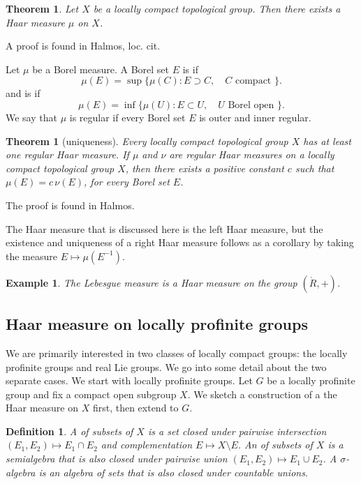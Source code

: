 \documentclass{amsart}
\newtheorem{definition}[equation]{Definition}
\newtheorem{theorem}[equation]{Theorem}
\newtheorem{example}[exercise]{Example}
\begin{document}
\begin{theorem} Let $X$ be a locally compact topological group.
Then there exists a Haar measure $\mu$ on $X$.
\end{theorem}

A proof is found in Halmos, loc. cit.

Let $\mu$ be a Borel measure.
A Borel set $E$ is 
 if
\[
\mu(E) = \sup \{\mu(C) : E\supset C,\quad C \text{ compact } \}.
\]
and is 
 if 
\[
\mu(E) = \inf \{\mu(U) : E\subset U,\quad U \text{ Borel open } \}.
\]
We say that $\mu$ is regular if every Borel set $E$ is outer and inner regular.

\begin{theorem}[uniqueness]  Every locally compact topological group $X$ has
 at least one regular Haar measure.  If $\mu$ and $\nu$ are regular
Haar measures on a locally compact topological group $X$, then there exists
a positive constant $c$ such that $\mu(E)=c\,\nu(E)$, for every Borel set $E$.
\end{theorem}

The proof is found in Halmos.

The Haar measure that is discussed here is the left Haar measure, but
the existence and uniqueness of a right Haar measure follows as a
corollary by taking the measure $E\mapsto \mu(E^{-1})$.

\begin{example} The Lebesgue measure is a Haar measure on the group
  $(\ring{R},+)$.
\end{example}

\newpage

\subsection{Haar measure on locally profinite groups}

We are primarily interested in two classes of locally compact groups:
the locally profinite groups and real Lie groups.  We go into some
detail about the two separate cases.  We start with locally profinite
groups.  Let $G$ be a locally profinite group and fix a compact open
subgroup $X$.  We sketch a construction of a 
the Haar measure on $X$ first, then extend
to $G$.

\begin{definition}
  A  of subsets of $X$ is a set closed under
  pairwise intersection $(E_1,E_2)\mapsto E_1\cap E_2$ and
  complementation $E\mapsto X\setminus E$.  An  of
  subsets of $X$ is a semialgebra that is also closed under pairwise
  union $(E_1,E_2)\mapsto E_1\cup E_2$.  A {\it $\sigma$-algebra} is
  an algebra of sets that is also closed under countable unions.
\end{definition}
\end{document}

